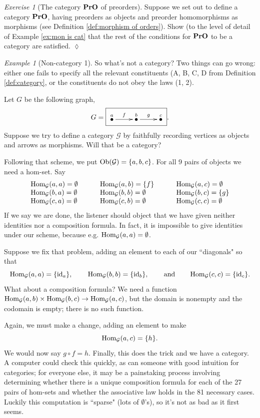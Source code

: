 \documentclass{book}
\def\tn{\textnormal}
\def\mc{\mathcal}
\def\Hom{\tn{Hom}}
\def\Ob{\tn{Ob}}
\def\hsp{\hspace{.3in}}
\def\to{\rightarrow}
\newcommand{\LMO}[1]{\stackrel{#1}{\bullet}}
\def\id{\tn{id}}
\def\PrO{{\bf PrO}}
\def\mcG{\mc{G}}
\theoremstyle{remark}
\newtheorem{example}[subsubsection]{Example}
\newtheorem{exc}[subsubsection]{Exercise}
\newenvironment{exercise}{\begin{exc}}{\hspace*{\fill}$\lozenge$\end{exc}}
\theoremstyle{definition}
\begin{document}
\begin{exercise}[The category $\PrO$ of preorders]\index{a category!$\PrO$}
Suppose we set out to define a category $\PrO$, having preorders as objects and preorder homomorphisms as morphisms (see Definition \ref{def:morphism of orders}). Show (to the level of detail of Example \ref{ex:mon is cat} that the rest of the conditions for $\PrO$ to be a category are satisfied.
\end{exercise}

\begin{example}[Non-category 1]

So what's not a category? Two things can go wrong: either one fails to specify all the relevant constituents (A, B, C, D from Definition \ref{def:category}, or the constituents do not obey the laws (1, 2).

Let $G$ be the following graph,
$$G=\fbox{\xymatrix{\LMO{a}\ar[r]^f&\LMO{b}\ar[r]^g&\LMO{c}}}.$$
Suppose we try to define a category $\mcG$ by faithfully recording vertices as objects and arrows as morphisms. Will that be a category?

Following that scheme, we put $\Ob(\mcG)=\{a,b,c\}$. For all 9 pairs of objects we need a hom-set.
Say 
\begin{align*}
\begin{array}{lll}
\Hom_\mcG(a,a)=\emptyset&\hsp\Hom_\mcG(a,b)=\{f\}&\hsp\Hom_\mcG(a,c)=\emptyset\\
\Hom_\mcG(b,a)=\emptyset&\hsp\Hom_\mcG(b,b)=\emptyset&\hsp\Hom_\mcG(b,c)=\{g\}\\
\Hom_\mcG(c,a)=\emptyset&\hsp\Hom_\mcG(c,b)=\emptyset&\hsp\Hom_\mcG(c,c)=\emptyset
\end{array}
\end{align*}
If we say we are done, the listener should object that we have given neither identities nor a composition formula. In fact, it is impossible to give identities under our scheme, because e.g. $\Hom_\mcG(a,a)=\emptyset$.

Suppose we fix that problem, adding an element to each of our ``diagonals" so that 
$$\Hom_\mcG(a,a)=\{\id_a\},\hsp\Hom_\mcG(b,b)=\{\id_b\},\hsp\tn{and}\hsp\Hom_\mcG(c,c)=\{\id_c\}.$$ What about a composition formula? We need a function $\Hom_\mcG(a,b)\times\Hom_\mcG(b,c)\to\Hom_\mcG(a,c)$, but the domain is nonempty and the codomain is empty; there is no such function. 

Again, we must make a change, adding an element to make $$\Hom_\mcG(a,c)=\{h\}.$$ We would now say $g\circ f=h$. Finally, this does the trick and we have a category. A computer could check this quickly, as can someone with good intuition for categories; for everyone else, it may be a painstaking process involving determining whether there is a unique composition formula for each of the 27 pairs of hom-sets and whether the associative law holds in the 81 necessary cases. Luckily this computation is ``sparse" (lots of $\emptyset$'s), so it's not as bad as it first seems.


\end{example}
\end{document}
